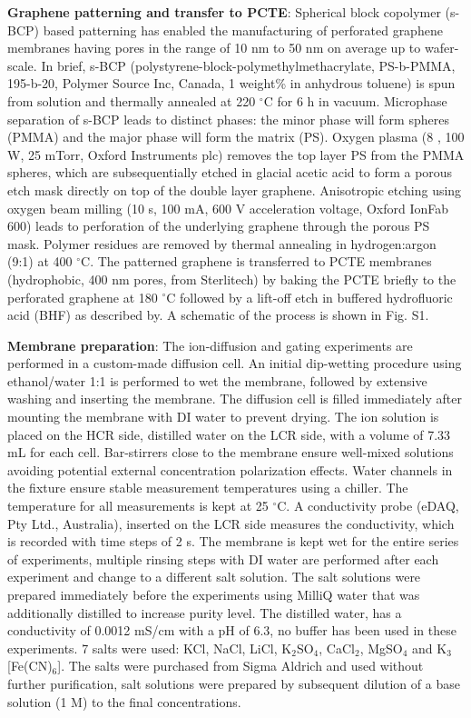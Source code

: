 \documentclass[journal=langd5,email=true, hyperref=true, keywords=false]{achemso}
\newcommand{\Fig}{Fig.}
\begin{document}
\vspace{1em}
\noindent
\textbf{Graphene patterning and transfer to PCTE}: Spherical block copolymer
(s-BCP) based patterning has enabled the manufacturing of perforated
graphene membranes having pores in the range of 10 nm to 50 nm on
average up to wafer-scale\cite{Choi_2018}. In brief, s-BCP
(polystyrene-block-polymethylmethacrylate, PS-b-PMMA, 195-b-20,
Polymer Source Inc, Canada, 1 weight\% in anhydrous toluene) is spun
from solution and thermally annealed at 220 $^{\circ}$C for 6 h in
vacuum. Microphase separation of s-BCP leads to distinct phases: the
minor phase will form spheres (PMMA) and the major phase will form the
matrix (PS). Oxygen plasma (8 , 100 W, 25 mTorr, Oxford Instruments
plc) removes the top layer PS from the PMMA spheres, which are
subsequentially etched in glacial acetic acid to form a porous etch
mask directly on top of the double layer graphene. Anisotropic etching
using oxygen beam milling (10 s, 100 mA, 600 V acceleration voltage,
Oxford IonFab 600) leads to perforation of the underlying graphene
through the porous PS mask. Polymer residues are removed by thermal
annealing in hydrogen:argon (9:1) at 400 $^{\circ}$C. The patterned
graphene is transferred to PCTE membranes (hydrophobic, 400 nm pores,
from Sterlitech) by baking the PCTE briefly to the perforated graphene
at 180 $^{\circ}$C followed by a lift-off etch in buffered
hydrofluoric acid (BHF) as described by\cite{Choi_2018}. A schematic
of the process is shown in \Fig{} S1.

\vspace{1em}
\noindent
\textbf{Membrane preparation}: The ion-diffusion and gating experiments are
performed in a custom-made diffusion cell. An initial dip-wetting
procedure using ethanol/water 1:1 is performed to wet the membrane,
followed by extensive washing and inserting the membrane. The
diffusion cell is filled immediately after mounting the membrane with
DI water to prevent drying. The ion solution is placed on the HCR
side, distilled water on the LCR side, with a volume of 7.33 mL for
each cell. Bar-stirrers close to the membrane ensure well-mixed
solutions avoiding potential external concentration polarization
effects. Water channels in the fixture ensure stable measurement
temperatures using a chiller. The temperature for all measurements is
kept at 25 $^{\circ}$C. A conductivity probe (eDAQ, Pty Ltd.,
Australia), inserted on the LCR side measures the conductivity, which
is recorded with time steps of 2 s. The membrane is kept wet for the
entire series of experiments, multiple rinsing steps with DI water are
performed after each experiment and change to a different salt
solution. The salt solutions were prepared immediately before the
experiments using MilliQ water that was additionally distilled to
increase purity level. The distilled water, has a conductivity of
0.0012 mS/cm with a pH of 6.3, no buffer has been used in these
experiments. 7 salts were used: KCl, NaCl, LiCl, K$_{2}$SO$_{4}$,
CaCl$_{2}$, MgSO$_{4}$ and K$_{3}$[Fe(CN)$_{6}$]. The salts were
purchased from Sigma Aldrich and used without further purification,
salt solutions were prepared by subsequent dilution of a base solution
(1 M) to the final concentrations.
\end{document}
